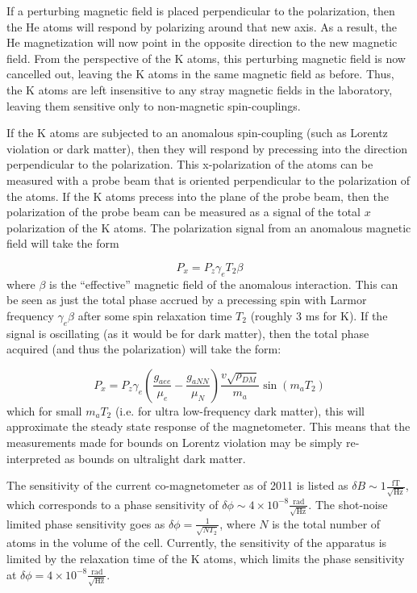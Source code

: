\documentclass[aps,prd,final,letterpaper]{revtex4}
\begin{document}
If a perturbing magnetic field is placed perpendicular to the polarization, then the He atoms will respond by polarizing around that new axis. As a result, the He magnetization will now point in the opposite direction to the new magnetic field. From the perspective of the K atoms, this perturbing magnetic field is now cancelled out, leaving the K atoms in the same magnetic field as before. Thus, the K atoms are left insensitive to any stray magnetic fields in the laboratory, leaving them sensitive only to non-magnetic spin-couplings. 

If the K atoms are subjected to an anomalous spin-coupling (such as Lorentz violation or dark matter), then they will respond by precessing into the direction perpendicular to the polarization. This x-polarization of the atoms can be measured with a probe beam that is oriented perpendicular to the polarization of the atoms. If the K atoms precess into the plane of the probe beam, then the polarization of the probe beam can be measured as a signal of the total $x$ polarization of the K atoms. The polarization signal from an anomalous magnetic field will take the form 

\begin{equation}
P_x = P_z\gamma_e T_2\beta
\end{equation}
where $\beta$ is the ``effective'' magnetic field of the anomalous interaction. This can be seen as just the total phase accrued by a precessing spin with Larmor frequency $\gamma_e \beta$ after some spin relaxation time $T_2$ (roughly 3 ms for K). If the signal is oscillating (as it would be for dark matter), then the total phase acquired (and thus the polarization) will take the form:

\begin{equation}
P_x = P_z\gamma_e \left(\frac{g_{aee}}{\mu_e} - \frac{g_{aNN}}{\mu_N}\right)\frac{v\sqrt{\rho_{DM}}}{m_a}\sin{(m_a T_2)}
\end{equation}
which for small $m_a T_2$ (i.e. for ultra low-frequency dark matter), this will approximate the steady state response of the magnetometer. This means that the measurements made for bounds on Lorentz violation may be simply re-interpreted as bounds on ultralight dark matter. 

The sensitivity of the current co-magnetometer as of 2011 is listed as $\delta B \sim 1 \frac{\mathrm{fT}}{\sqrt{\mathrm{Hz}}}$, which corresponds to a phase sensitivity of $\delta \phi \sim 4\times 10^{-8} \frac{\mathrm{rad}}{\sqrt{\mathrm{Hz}}}$. The shot-noise limited phase sensitivity goes as $\delta \phi = \frac{1}{\sqrt{N T_2}}$, where $N$ is the total number of atoms in the volume of the cell. Currently, the sensitivity of the apparatus is limited by the relaxation time of the K atoms, which limits the phase sensitivity at $\delta \phi = 4\times 10^{-8} \frac{\mathrm{rad}}{\sqrt{\mathrm{Hz}}}$.
\end{document}
